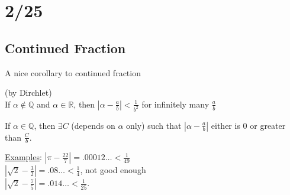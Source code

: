 \section*{2/25}
  \subsection*{Continued Fraction}
    A nice corollary to continued fraction
    \begin{theorem}
      (by Dirchlet)\\
      If $\alpha \not\in \mathbb{Q}$ and $\alpha \in \mathbb{R}$, then
      $| \alpha - \frac{a}{b}| < \frac{1}{b^2}$ for infinitely many
      $\frac{a}{b}$
    \end{theorem}
    \begin{theorem}
      If $\alpha \in \mathbb{Q}$, then $\exists C$ (depends on $\alpha$ only)
      such that $|\alpha - \frac{a}{b}|$ either is 0 or greater than $\frac{C}
      {b}$.
    \end{theorem}
    \noindent\underline{Examples}: $|\pi - \frac{22}{7}| = .00012\ldots < 
    \frac{1}{49}$\\
    $|\sqrt{2} - \frac{3}{2}| = .08\ldots < \frac{1}{4}$, not good enough\\
    $|\sqrt{2} - \frac{7}{5}| = .014\ldots < \frac{1}{25}$.\\

